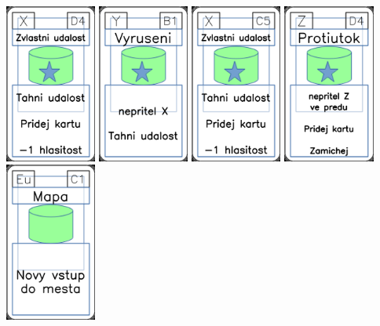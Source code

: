 \documentclass[a4paper]{article}
\begin{document}
	\includegraphics[width=3.0cm]{img-5_18}
	\includegraphics[width=3.0cm]{img-5_35}
	\includegraphics[width=3.0cm]{img-5_14}
	\includegraphics[width=3.0cm]{img-5_48}
	\includegraphics[width=3.0cm]{img-4_40}
\end{document}
